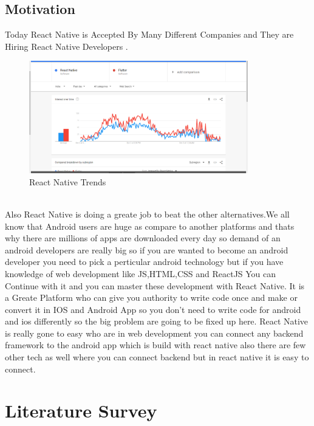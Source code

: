 \documentclass[12pt,a4paper]{report}
\begin{document}
\section{Motivation}
\hspace{0.5cm} Today React Native is Accepted By Many Different Companies and They are Hiring React Native Developers . \\
\begin{figure}[h]
    \centering
    \includegraphics[width=0.85\textwidth]{react_trends}
\caption{React Native Trends}
    \label{fig:1}
\end{figure}
\\
Also React Native is doing a greate job to beat the other alternatives.We all know that Android users are huge as compare to another platforms and thats why there are millions of apps are downloaded every day so demand of an android developers are really big so if you are wanted to become an android developer you need to pick a perticular android technology but if you have knowledge of web development like JS,HTML,CSS and ReactJS You can Continue with it and you can master these development with React Native. It is a Greate Platform who can give you authority to write code once and make or convert it in IOS and Android App so you don't need to write code for android and ios differently so the big problem are going to be fixed up here. React Native is really gone to easy who are in web development you can connect any backend framework to the android app which is build with react native also there are few other tech as well where you can connect backend but in react native it is easy to connect.

\newpage

\chapter{Literature Survey}
\end{document}
